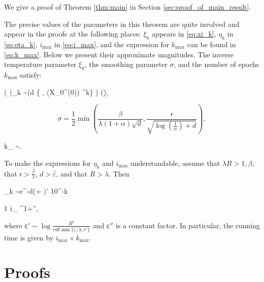 \documentclass[final,12pt]{colt2018} %
\def \be{\begin{equs}}
\def \ee{\end{equs}}
\begin{document}
{\noindent
We give a proof of Theorem \ref{thm:main} in Section \ref{sec:proof_of_main_result}.

\noindent
%
The precise values of the parameters in this theorem are quite involved and appear in the proofs at the following places:
%
$\xi_k$ appears in \eqref{eq:xi_k}, $\eta_k$ in \eqref{eq:eta_k}, $i_{\mathrm{max}}$ in \eqref{eq:i_max}, and the expression for $k_{\mathrm{max}}$ can be found in \eqref{eq:k_max}.
%
Below we present their approximate magnitudes. 
%
The inverse temperature parameter $\xi_k$, the smoothing parameter $\sigma$, and the number of epochs $k_{\mathrm{max}}$ satisfy:
\be
\tilde{\Omega}\left( \right)\leq \xi_k \sim {}\left(d \cdot {} \left\{ , (X_0^{(0)}) ^k\right\} \right) \leq {}\left(\right),
\ee
$$ \sigma  = \frac{1}{2} \min\left(\frac{\beta}{\lambda(1+\alpha)\sqrt{d}}, \frac{\mathsf{r}}{\sqrt{\log(\frac{1}{\alpha})+d}}\right),$$


\be
k_{} \sim \log {}.
\ee


\noindent
To make the expressions for $\eta_k$ and $i_{\mathrm{max}}$ understandable,   assume that  $\lambda R > 1, \beta$, that  $\mathsf{r} > \frac{\beta}{\lambda}$, $d > \hat{\varepsilon}$, and that  $R> \lambda$. Then
\be
\eta_k \sim {}e^{-d\left(\alpha + \frac{\beta}{\hat{\varepsilon}}\right)'}  10^{-k}
\ee


\be
1 \leq i_{} \leq {}^{1+''\alpha},
\ee



\noindent
where $\mathsf{c}' \sim \log\frac{R^2}{rd \delta \min\{ \hat{\varepsilon}/\lambda, r'\}}$
and $\mathsf{c}''$ is a constant factor.  In particular, the running time is given by $i_{\mathrm{max}} \times k_{\mathrm{max}}$.
\section{Proofs} \label{sec:proofs}

}
\end{document}
